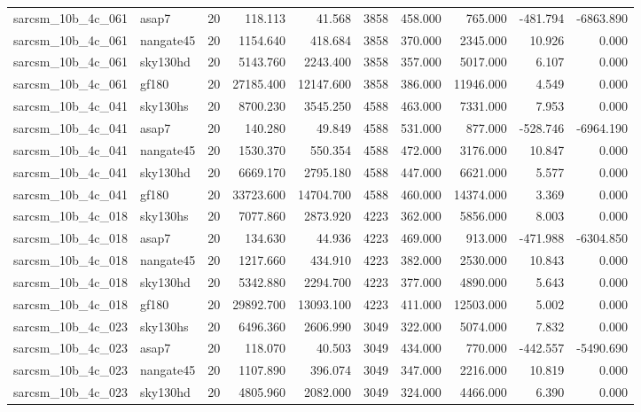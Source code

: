 \begin{longtable}{llrrrrrrrr}
sarcsm\_10b\_4c\_061 & asap7 & 20 & 118.113 & 41.568 & 3858 & 458.000 & 765.000 & -481.794 & -6863.890 \\
sarcsm\_10b\_4c\_061 & nangate45 & 20 & 1154.640 & 418.684 & 3858 & 370.000 & 2345.000 & 10.926 & 0.000 \\
sarcsm\_10b\_4c\_061 & sky130hd & 20 & 5143.760 & 2243.400 & 3858 & 357.000 & 5017.000 & 6.107 & 0.000 \\
sarcsm\_10b\_4c\_061 & gf180 & 20 & 27185.400 & 12147.600 & 3858 & 386.000 & 11946.000 & 4.549 & 0.000 \\
sarcsm\_10b\_4c\_041 & sky130hs & 20 & 8700.230 & 3545.250 & 4588 & 463.000 & 7331.000 & 7.953 & 0.000 \\
sarcsm\_10b\_4c\_041 & asap7 & 20 & 140.280 & 49.849 & 4588 & 531.000 & 877.000 & -528.746 & -6964.190 \\
sarcsm\_10b\_4c\_041 & nangate45 & 20 & 1530.370 & 550.354 & 4588 & 472.000 & 3176.000 & 10.847 & 0.000 \\
sarcsm\_10b\_4c\_041 & sky130hd & 20 & 6669.170 & 2795.180 & 4588 & 447.000 & 6621.000 & 5.577 & 0.000 \\
sarcsm\_10b\_4c\_041 & gf180 & 20 & 33723.600 & 14704.700 & 4588 & 460.000 & 14374.000 & 3.369 & 0.000 \\
sarcsm\_10b\_4c\_018 & sky130hs & 20 & 7077.860 & 2873.920 & 4223 & 362.000 & 5856.000 & 8.003 & 0.000 \\
sarcsm\_10b\_4c\_018 & asap7 & 20 & 134.630 & 44.936 & 4223 & 469.000 & 913.000 & -471.988 & -6304.850 \\
sarcsm\_10b\_4c\_018 & nangate45 & 20 & 1217.660 & 434.910 & 4223 & 382.000 & 2530.000 & 10.843 & 0.000 \\
sarcsm\_10b\_4c\_018 & sky130hd & 20 & 5342.880 & 2294.700 & 4223 & 377.000 & 4890.000 & 5.643 & 0.000 \\
sarcsm\_10b\_4c\_018 & gf180 & 20 & 29892.700 & 13093.100 & 4223 & 411.000 & 12503.000 & 5.002 & 0.000 \\
sarcsm\_10b\_4c\_023 & sky130hs & 20 & 6496.360 & 2606.990 & 3049 & 322.000 & 5074.000 & 7.832 & 0.000 \\
sarcsm\_10b\_4c\_023 & asap7 & 20 & 118.070 & 40.503 & 3049 & 434.000 & 770.000 & -442.557 & -5490.690 \\
sarcsm\_10b\_4c\_023 & nangate45 & 20 & 1107.890 & 396.074 & 3049 & 347.000 & 2216.000 & 10.819 & 0.000 \\
sarcsm\_10b\_4c\_023 & sky130hd & 20 & 4805.960 & 2082.000 & 3049 & 324.000 & 4466.000 & 6.390 & 0.000 \\

\end{longtable}
